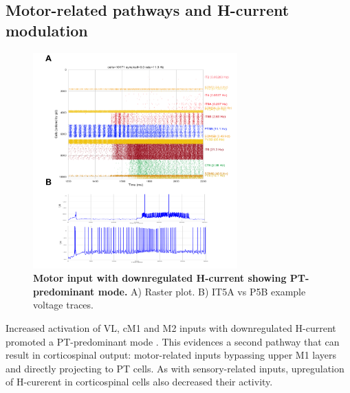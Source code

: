 \subsection{Motor-related pathways and H-current modulation}

\begin{figure}[!h]  %
\centering
\includegraphics[width=0.7\textwidth]{figs/PT_mode.png}
\caption{{\bf Motor input with downregulated H-current showing PT-predominant mode.}
A) Raster plot. B) IT5A vs P5B example voltage traces. 
}
\label{fig_PT_mode}
\end{figure}


Increased activation of VL, cM1 and M2 inputs with downregulated H-current promoted a PT-predominant mode . This evidences a second pathway that can result in corticospinal output: motor-related inputs bypassing upper M1 layers and directly projecting to PT cells. As with sensory-related inputs, upregulation of H-curerent in corticospinal cells also decreased their activity.



